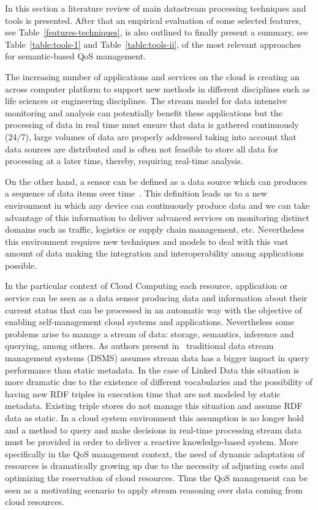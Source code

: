 In this section a literature review of main datastream processing techniques and tools is presented. After that 
an empirical evaluation of some selected features, see Table~\ref{features-techniques}, is also outlined to finally present 
a summary, see Table~\ref{table:tools-1} and Table~\ref{table:tools-ii}, of the most 
relevant approaches for semantic-based QoS management.

The increasing number of applications and services on the cloud is creating an 
across computer platform to support new methods in different disciplines such as 
life sciences or engineering disciplines. The stream model for data intensive 
monitoring and analysis can potentially benefit these applications but the 
processing of data in real time must ensure that data is gathered continuously 
(24/7), large volumes of data are properly addressed taking into account that 
data sources are distributed and is often not feasible to store all data for 
processing at a later time, thereby, requiring real-time analysis. 

On the other hand, a sensor can be defined as a data source which can produces a 
sequence of data items over time~\cite{deri2010}. This definition leads us to a new 
environment in which any device can continuously produce data and we can take 
advantage of this information to deliver advanced services on monitoring 
distinct domains such as traffic, logistics or supply chain management, etc. Nevertheless
this environment requires new techniques and models to deal with this 
vast amount of data making the integration and interoperability among 
applications possible.

In the particular context of Cloud Computing each resource, application or 
service can be seen as a data sensor producing data and information about their 
current status that can be processed in an automatic way with the objective of 
enabling self-management cloud systems and applications. Nevertheless some 
problems arise to manage a stream of data: storage, semantics, inference and 
querying, among others. As authors present in~\cite{deri2010} traditional data stream 
management systems (DSMS) assumes stream data has a bigger impact in query 
performance than static metadata. In the case of Linked Data this situation is 
more dramatic due to the existence of different vocabularies and the possibility 
of having new RDF triples in execution time that are not modeled by static 
metadata. Existing triple stores do not manage this situation and assume RDF 
data as static. In a cloud system environment this assumption is no longer hold 
and a method to query and make decisions in real-time processing stream data 
must be provided in order to deliver a reactive knowledge-based system. More 
specifically in the QoS management context, the need of dynamic adaptation of 
resources is dramatically growing up due to the necessity of adjusting costs and 
optimizing the reservation of cloud resources. Thus the QoS management can be 
seen as a motivating scenario to apply stream reasoning over data coming from 
cloud resources.

